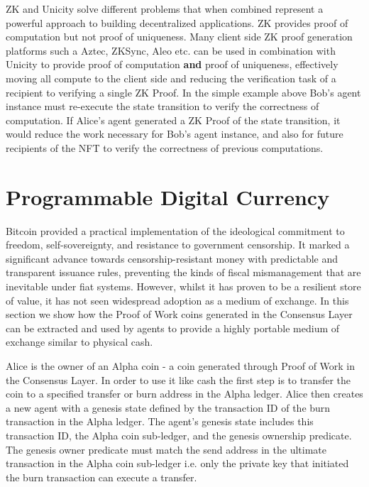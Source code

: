 \documentclass{article}
\begin{document}
\vspace{2mm}


ZK and Unicity solve different problems that when combined represent a powerful approach to building decentralized applications. ZK provides proof of computation but not proof of uniqueness. Many client side ZK proof generation platforms such a Aztec, ZKSync, Aleo etc. can be used in combination with Unicity to provide proof of computation \textbf{and} proof of uniqueness, effectively moving all compute to the client side and reducing the verification task of a recipient to verifying a single ZK Proof. In the simple example above Bob's agent instance must re-execute the state transition to verify the correctness of computation. If Alice's agent generated a ZK Proof of the state transition, it would reduce the work necessary for Bob's agent instance, and also for future recipients of the NFT to verify the correctness of previous computations.



\section{Programmable Digital Currency}

Bitcoin provided a practical implementation of the ideological commitment to freedom, self-sovereignty, and resistance to government censorship.  It marked a significant advance towards censorship-resistant money with predictable and transparent issuance rules, preventing the kinds of fiscal mismanagement that are inevitable under fiat systems. However, whilst it has proven to be a resilient store of value, it has not seen widespread adoption as a medium of exchange. In this section we show how the Proof of Work coins generated in the Consensus Layer can be extracted and used by agents to provide a highly portable medium of exchange similar to physical cash.

\vspace{2mm}

Alice is the owner of an Alpha coin - a coin generated through Proof of Work in the Consensus Layer. In order to use it like cash the first step is to transfer the coin to a specified transfer or burn address in the Alpha ledger. Alice then creates a new agent with a genesis state defined by the transaction ID of the burn transaction in the Alpha ledger. The agent's genesis state includes this transaction ID, the Alpha coin sub-ledger, and the genesis ownership predicate. The genesis owner predicate must match the send address in the ultimate transaction in the Alpha coin sub-ledger i.e. only the private key that initiated the burn transaction can execute a transfer.
\end{document}
